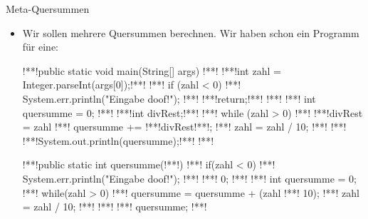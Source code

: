 {
\begin{frame}[fragile]{Meta-Quersummen}
\begin{itemize}[<+(1)->]
    \item<2-> Wir sollen mehrere Quersummen berechnen. Wir haben schon ein Programm für eine:\vfill{}
\columns[onlytextwidth,c]
\begin{plainjava}
!**!public static void main(String[] args) {
!**!   !**!int zahl = Integer.parseInt(args[0]);!**!
!**!   if (zahl < 0) {
!**!      System.err.println("Eingabe doof!");
!**!      !**!return;!**!
!**!   }
!**!   int quersumme = 0;
!**!   !**!int divRest;!**!
!**!   while (zahl > 0) {
!**!      !**!divRest = zahl %
!**!      quersumme += !**!divRest!**!;
!**!      zahl = zahl / 10;
!**!   }
!**!   !**!System.out.println(quersumme);!**!
!**!}
\end{plainjava}
\column{0pt}
\clap{$\to$}
\makeatletter
\begin{plainjava}
!**!public static int quersumme(!**!) {
!**!    if(zahl < 0){
!**!        System.err.println("Eingabe doof!");
!**!        !**! 0;
!**!    }
!**!    int quersumme = 0;
!**!    while(zahl > 0){
!**!        quersumme = quersumme + (zahl !**! 10);
!**!        zahl = zahl / 10;
!**!    }
!**!    !**! quersumme;
!**!}
\end{plainjava}
\endcolumns
\end{itemize}
\end{frame}}
